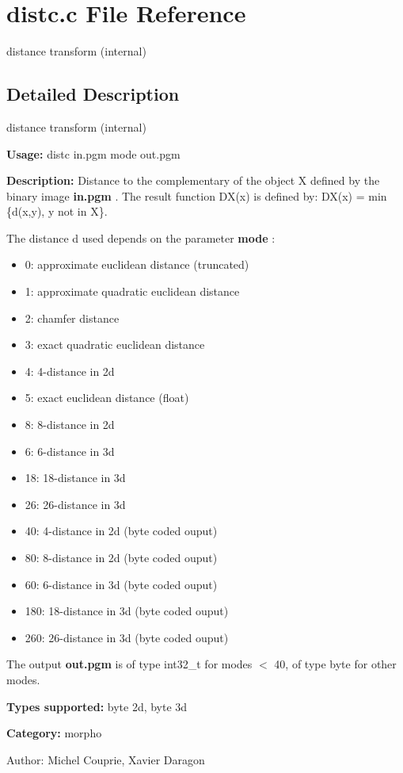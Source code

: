 \section{distc.c File Reference}
\label{distc_8c}
distance transform (internal) 



\subsection{Detailed Description}
distance transform (internal) 

{\bf Usage:} distc in.pgm mode out.pgm

{\bf Description:} Distance to the complementary of the object X defined by the binary image {\bf in.pgm} . The result function DX(x) is defined by: DX(x) = min \{d(x,y), y not in X\}.

The distance d used depends on the parameter {\bf mode} : \begin{itemize}
\item 0: approximate euclidean distance (truncated) \item 1: approximate quadratic euclidean distance \item 2: chamfer distance \item 3: exact quadratic euclidean distance \item 4: 4-distance in 2d \item 5: exact euclidean distance (float) \item 8: 8-distance in 2d \item 6: 6-distance in 3d \item 18: 18-distance in 3d \item 26: 26-distance in 3d \item 40: 4-distance in 2d (byte coded ouput) \item 80: 8-distance in 2d (byte coded ouput) \item 60: 6-distance in 3d (byte coded ouput) \item 180: 18-distance in 3d (byte coded ouput) \item 260: 26-distance in 3d (byte coded ouput)\end{itemize}
The output {\bf out.pgm} is of type int32\_\-t for modes $<$ 40, of type byte for other modes.

{\bf Types supported:} byte 2d, byte 3d

{\bf Category:} morpho

\begin{Desc}
\item[Author:]Michel Couprie, Xavier Daragon \end{Desc}
